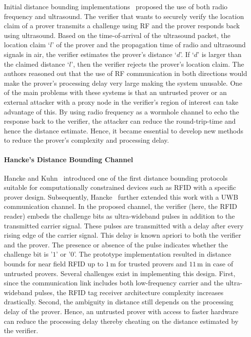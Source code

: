 \documentclass{sig-alternate-10pt}
\newcommand{\unit}[1]{\ensuremath{\, \mathrm{#1}}}
\begin{document}
Initial distance bounding implementations~\cite{SastrySep03,RasmussenOct08}
proposed the use of both radio frequency and ultrasound. The verifier that wants
to securely verify the location claim of a prover transmits a challenge using RF
and the prover responds back using ultrasound. Based on the time-of-arrival of
the ultrasound packet, the location claim `$l$' of the prover and the
propagation time of radio and ultrasound signals in air, the verifier estimates
the prover's distance `$d$'. If `$d$' is larger than the claimed distance `$l$',
then the verifier rejects the prover's location claim. The authors reasoned out
that the use of RF communication in both directions would make the prover's
processing delay very large making the system unusable. One of the main problems
with these systems is that an untrusted prover or an external attacker with a
proxy node in the verifier's region of interest can take advantage of this. By
using radio frequency as a wormhole channel to echo the response back to the
verifier, the attacker can reduce the round-trip-time and hence the distance
estimate. Hence, it became essential to develop new methods to reduce the
prover's complexity and processing delay.


\paragraph{Hancke's Distance Bounding Channel} Hancke and
Kuhn~\cite{HanckeSep05} introduced one of the first distance bounding protocols
suitable for computationally constrained devices such as RFID with a specific
prover design. Subsequently, Hancke~\cite{HanckeMay11} further extended this
work with a UWB communication channel. In the proposed channel, the verifier
(here, the RFID reader) embeds the challenge bits as ultra-wideband pulses in
addition to the transmitted carrier signal. These pulses are transmitted with a
delay after every rising edge of the carrier signal. This delay is known apriori
to both the verifier and the prover. The presence or absence of the pulse
indicates whether the challenge bit is '$1$' or '$0$'. The prototype
implementation resulted in distance bounds for near field RFID up to $1\unit{m}$
for trusted provers and $11\unit{m}$ in case of untrusted provers. Several
challenges exist in implementing this design. First, since the communication
link includes both low-frequency carrier and the ultra-wideband pulses, the RFID
tag receiver architecture complexity increases drastically. Second, the
ambiguity in distance still depends on the processing delay of the prover.
Hence, an untrusted prover with access to faster hardware can reduce the
processing delay thereby cheating on the distance estimated by the verifier.
\end{document}
